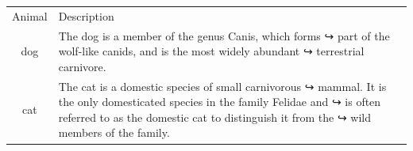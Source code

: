 \documentclass{article}
\begin{document}
\begin{tabular}{cp{9cm}}
Animal & Description \\
dog & The dog is a member of the genus Canis, which forms
↪ part of the
wolf-like canids, and is the most widely abundant
↪ terrestrial
carnivore. \\
cat & The cat is a domestic species of small carnivorous
↪ mammal. It is the
only domesticated species in the family Felidae and
↪ is often referred
to as the domestic cat to distinguish it from the
↪ wild members of the
family. \\
\end{tabular}
\end{document}
